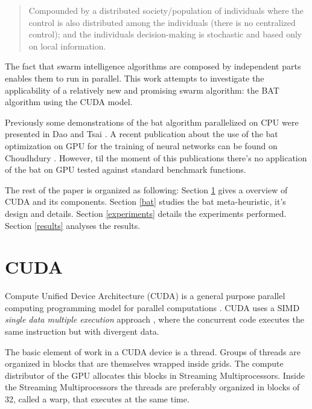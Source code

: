 \documentclass[conference]{IEEEtran}
\begin{document}
\begin{quote} Compounded by a distributed society/population of
individuals where the control is also distributed among the individuals
(there is no centralized control); and the individuals decision-making
is stochastic and based only on local information.\end{quote}

The fact that swarm intelligence algorithms are composed by
independent parts enables them to run in parallel. This work attempts
to investigate the applicability of a relatively new and promising
swarm algorithm: the BAT algorithm using the CUDA model. 

Previously some demonstrations of the bat algorithm parallelized on CPU
were presented in Dao \cite{paralellCPUFirst} and Tsai \cite{paralellCPU}. A
recent publication about the use of the bat optimization on GPU for the training of neural networks can be found on
Choudhdury \cite{firstBatGPU}. However, til the moment of this publications
there's no application of the bat on GPU tested against standard
benchmark functions.

The rest of the paper is organized as following: Section \ref{cuda}
gives a overview of CUDA and its components. Section \ref{bat}
studies the bat meta-heuristic, it's design and details. Section
\ref{experiments} details the experiments performed. Section
\ref{results} analyses the results.


\section{CUDA} \label{cuda}%

Compute Unified Device Architecture (CUDA) is a general purpose
parallel computing programming model for parallel computations
\cite{cudaDefinition}. CUDA uses a SIMD \textit{single data multiple
execution} approach \cite{gpuOptimization}, where the concurrent code
executes the same instruction but with divergent data.


The basic element of work in a CUDA device is a thread. Groups of
threads are organized in blocks that are themselves wrapped inside
grids. The compute distributor of the GPU allocates this blocks in
Streaming Multiprocessors. Inside the Streaming Multiprocessors the
threads are preferably organized in blocks of 32, called a warp, that
executes at the same time.
\end{document}
